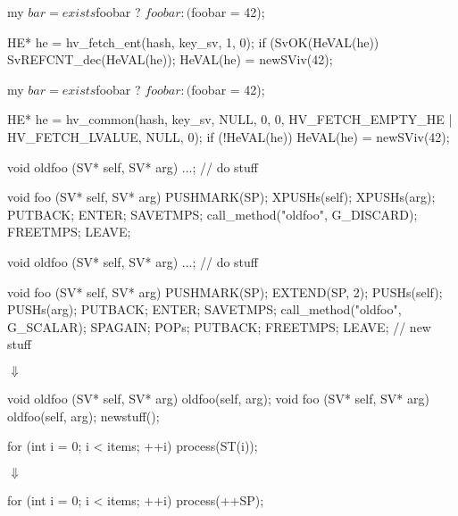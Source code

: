 \documentclass[mathserif,hyperref={urlcolor=cyan,colorlinks=true}]{beamer}
\begin{document}
{\begin{frame}[fragile]
\begin{perlcode}
my $bar = exists $foo{bar} ? $foo{bar} : ($foo{bar} = 42);
\end{perlcode}
\begin{ccode}
HE* he = hv_fetch_ent(hash, key_sv, 1, 0);
if (SvOK(HeVAL(he)) {
    SvREFCNT_dec(HeVAL(he));
    HeVAL(he) = newSViv(42);
}
\end{ccode}
\end{frame}

\begin{frame}[fragile]
\begin{perlcode}
my $bar = exists $foo{bar} ? $foo{bar} : ($foo{bar} = 42);
\end{perlcode}
\begin{ccode}
HE* he = hv_common(hash, key_sv, NULL, 0, 0,
    HV_FETCH_EMPTY_HE | HV_FETCH_LVALUE, NULL, 0);
if (!HeVAL(he)) {
    HeVAL(he) = newSViv(42);
}
\end{ccode}
\end{frame}

\begin{frame}[fragile]
\begin{ccode}
void
oldfoo (SV* self, SV* arg) {
    ...; // do stuff
}

void
foo (SV* self, SV* arg) {
    PUSHMARK(SP); 
    XPUSHs(self);
    XPUSHs(arg);
    PUTBACK; ENTER; SAVETMPS;
    call_method("oldfoo", G_DISCARD);
    FREETMPS; LEAVE;
}
\end{ccode}
\end{frame}

\begin{frame}[fragile]
\begin{ccode}
void
oldfoo (SV* self, SV* arg) {
    ...; // do stuff
}

void
foo (SV* self, SV* arg) {
    PUSHMARK(SP);
    EXTEND(SP, 2);
    PUSHs(self);
    PUSHs(arg);
    PUTBACK; ENTER; SAVETMPS;
    call_method("oldfoo", G_SCALAR);
    SPAGAIN; POPs; PUTBACK;
    FREETMPS; LEAVE;
    // new stuff
}
\end{ccode}
\pause
{$\Downarrow$}
\begin{ccode}
void
oldfoo (SV* self, SV* arg) {
    oldfoo(self, arg);
}
void
foo (SV* self, SV* arg) {
    oldfoo(self, arg);
    newstuff();
}
\end{ccode}
\end{frame}

\begin{frame}[fragile]
\begin{ccode}
for (int i = 0; i < items; ++i) {
    process(ST(i));
}
\end{ccode}
\pause
{$\Downarrow$}
\begin{ccode}
for (int i = 0; i < items; ++i) {
    process(++SP);
}
\end{ccode}
\end{frame}

}
\end{document}
